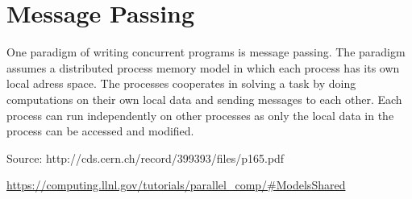 \section{Message Passing}

One paradigm of writing concurrent programs is message passing. The paradigm assumes a distributed process memory model in which each process has its own local adress space. The processes cooperates in solving a task by doing computations on their own local data and sending messages to each other. Each process can run independently on other processes as only the local data in the process can be accessed and modified.

Source: http://cds.cern.ch/record/399393/files/p165.pdf

\url{https://computing.llnl.gov/tutorials/parallel_comp/#ModelsShared}
